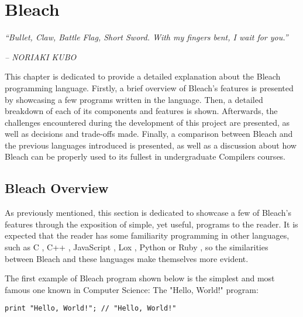 \chapter{Bleach} \label{cap:metodologia}

\begin{displayquote}
    \begin{center}
        \textit{``Bullet, Claw, Battle Flag, Short Sword. With my fingers bent, I wait for you.''}
    \end{center}
\end{displayquote}

\begin{flushright}
   \textit{-- NORIAKI KUBO}
\end{flushright}

This chapter is dedicated to provide a detailed explanation about the Bleach programming language. Firstly, a brief overview of Bleach's features is presented by showcasing a few programs written in the language. Then, a detailed breakdown of each of its components and features is shown. Afterwards, the challenges encountered during the development of this project are presented, as well as decisions and trade-offs made. Finally, a comparison between Bleach and the previous languages introduced is presented, as well as a discussion about how Bleach can be properly used to its fullest in undergraduate Compilers courses.

\section{Bleach Overview}
As previously mentioned, this section is dedicated to showcase a few of Bleach's features through the exposition of simple, yet useful, programs to the reader. It is expected that the reader has some familiarity programming in other languages, such as C \cite{kernighan1988c}, C++ \cite{strousrup2000c++}, JavaScript \cite{javascript_language}, Lox \cite{nystrom2021crafting}, Python \cite{python_language} or Ruby \cite{ruby_language}, so the similarities between Bleach and these languages make themselves more evident.

\newpage

The first example of Bleach program shown below is the simplest and most famous one known in Computer Science: The "Hello, World!" program: \newline
\begin{lstlisting}
print "Hello, World!"; // "Hello, World!"
\end{lstlisting}


